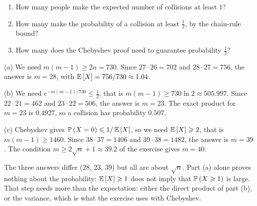 \begin{exercisebox}
\begin{pproblem}[The numbers for $n = 365$]\label{pp:bday365}
    \leavevmode
    \begin{enumerate}[label=(\alph*)]
        \item How many people make the expected number of collisions at least $1$?
        \item How many make the probability of a collision at least $\frac{1}{2}$, by the chain-rule
              bound?
        \item How many does the Chebyshev proof need to guarantee probability $\frac{1}{2}$?
    \end{enumerate}
\end{pproblem}
\tcblower
\begin{wsolution}
    (a) We need $m(m-1) \geq 2n = 730$. Since $27 \cdot 26 = 702$ and $28 \cdot 27 = 756$, the
    answer is $m = 28$, with $\operatorname{\mathbb{E}}\left[X\right] = 756/730 \approx 1.04$.

    (b) We need $e^{-m(m-1)/730} \leq \frac{1}{2}$, that is $m(m-1) \geq 730 \ln 2 \approx 505.997$.
    Since $22 \cdot 21 = 462$ and $23 \cdot 22 = 506$, the answer is $m = 23$. The exact product for
    $m = 23$ is $0.4927$, so a collision has probability $0.507$.

    (c) Chebyshev gives $\operatorname{\mathbb{P}}\left(X = 0\right) \leqslant 1/\operatorname{\mathbb{E}}\left[X\right]$, so we need
    $\operatorname{\mathbb{E}}\left[X\right] \geqslant 2$, that is $m(m-1) \geq 1460$. Since $38 \cdot 37 = 1406$ and
    $39 \cdot 38 = 1482$, the answer is $m = 39$. The condition $m \geq 2\sqrt{n} + 1 \approx 39.2$
    of the exercise gives $m = 40$.

    The three answers differ ($28$, $23$, $39$) but all are about $\sqrt{n}$. Part (a) alone proves
    nothing about the probability: $\operatorname{\mathbb{E}}\left[X\right] \geqslant 1$ does not imply that
    $\operatorname{\mathbb{P}}\left(X \geqslant 1\right)$ is large. That step needs more than the expectation: either the direct
    product of part (b), or the variance, which is what the exercise uses with Chebyshev.
\end{wsolution}
\end{exercisebox}

